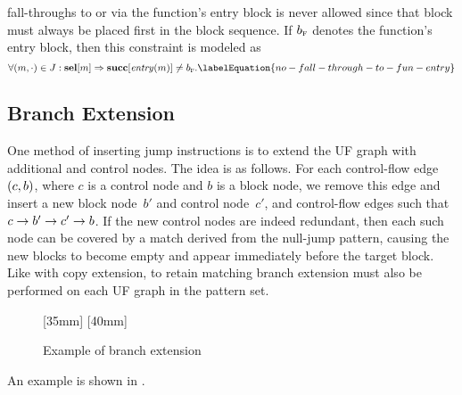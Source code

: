 \Glspl{fall-through} to or via the \gls{function}'s \gls{entry block} is never
allowed since that \gls{block} must always be placed first in the \gls{block}
sequence.
%
If $b_{\textrm{\textsc{f}}}$ denotes the \gls{function}'s \gls{entry block}, then
this \gls{constraint} is modeled as
%
\begin{equation}
  \forall \mPair{m}{\cdot} \in \mFallThroughSet :
  \mVar{sel}[m]
  \mImp
  \mVar{succ}[\mEntry(m)] \neq \mFunctionEntryBlock.
  \labelEquation{no-fall-through-to-fun-entry}
\end{equation}


\subsection{Branch Extension}

One method of inserting jump \glspl{instruction} is to extend the \gls{UF graph}
with additional  and \glspl{control node}.
%
The idea is as follows.
%
For each \gls{control-flow edge}~$\mPair{c}{b}$, where $c$ is a \gls{control
  node} and $b$ is a \gls{block node}, we remove this \gls{edge} and insert a
new \gls{block node}~$b'$ and \gls{control node}~$c'$, and \glspl{control-flow
  edge} such that \mbox{$c \rightarrow b' \rightarrow c' \rightarrow b$}.
%
If the new \glspl{control node} are indeed redundant, then each such \gls{node}
can be covered by a \gls{match} derived from the \gls{null-jump pattern},
causing the new \glspl{block} to become empty and appear immediately before the
target \gls{block}.
%
Like with \gls{copy extension}, to retain matching \gls{branch extension} must
also be performed on each \gls{UF graph} in the \gls{pattern set}.
%
\begin{figure}
  \mbox{}%
  \hfill%
                [35mm]%
                {%
                }%
  \hfill%
                [40mm]%
                {%
                }%
  \hfill%
  \mbox{}

  \caption{Example of branch extension}%
\end{figure}
%
An example is shown in .

